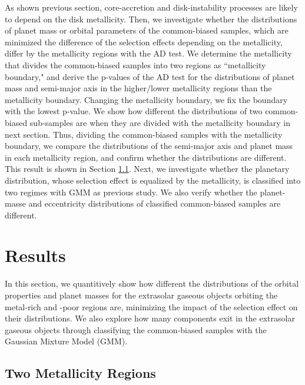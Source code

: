 \documentclass[twocolumn, dvipdfmx]{aastex62}
\begin{document}
\begin{CJK*}{UTF8}{min}
As shown previous section, core-accretion and disk-instability processes are likely to depend on the disk metallicity. Then, we investigate whether the distributions of planet mass or orbital parameters of the common-biased samples, which are minimized the difference of the selection effects depending on the metallicity, differ by the metallicity regions with the AD test. We determine the metallicity that divides the common-biased samples into two regions as ``metallicity boundary," and derive the p-values of the AD test for the distributions of planet mass and semi-major axis in the higher/lower metallicity regions than the metallicity boundary. Changing the metallicity boundary, we fix the boundary with the lowest p-value. We show how different the distributions of two common-biased sub-samples are when they are divided with the metallicity boundary in next section. Thus, dividing the common-biased samples with the metallicity boundary, we compare the distributions of the semi-major axis and planet mass in each metallicity region, and confirm whether the distributions are different. This result is shown in Section \ref{subsec:metal}. Next, we investigate whether the planetary distribution, whose selection effect is equalized by the metallicity, is classified into two regimes with GMM as previous study. We also verify whether the planet-masse and eccentricity distributions of classified common-biased samples are different.


\section{Results} \label{sec:results}

In this section, we quantitively show how different the distributions of the orbital properties and planet masses for the extrasolar gaseous objects orbiting the metal-rich and -poor regions are, minimizing the impact of the selection effect on their distributions. We also explore how many components exit in the extrasolar gaseous objects through classifying the common-biased samples with the Gaussian Mixture Model (GMM).


\subsection{Two Metallicity Regions} \label{subsec:metal}


\end{CJK*}
\end{document}
